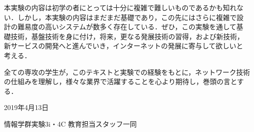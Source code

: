 本実験の内容は初学の者にとっては十分に複雑で難しいものであるかも知れな
い．しかし，本実験の内容はまだまだ基礎であり，この先にはさらに複雑で設
計の難易度の高いシステムが数多く存在している．ぜひ，この実験を通して基
礎技術，基盤技術を身に付け，将来，更なる発展技術の習得，および新技術，
新サービスの開発へと進んでいき，インターネットの発展に寄与して欲しいと
考える．

全ての専攻の学生が，このテキストと実験での経験をもとに，ネットワーク技術
の仕組みを理解し，様々な業界で活躍することを心より期待し，巻頭の言とする．

\begin{flushright}
 2019年4月13日

 情報学群実験3i・4C 教育担当スタッフ一同
\end{flushright}
